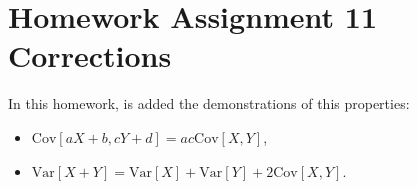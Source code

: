 \documentclass[10pt,leter,openany]{article}
\begin{document}
	
	
\section*{Homework Assignment 11 Corrections}

	In this homework, is added the demonstrations of this properties:
	\begin{itemize}
		\item $\mbox{Cov}[aX+b, cY+d] = ac\mbox{Cov}[X,Y]$,
		\item $\mbox{Var}[X+Y] = \mbox{Var}[X] + \mbox{Var}[Y] + 2\mbox{Cov}[X,Y]$.
	\end{itemize}












	
\end{document}
